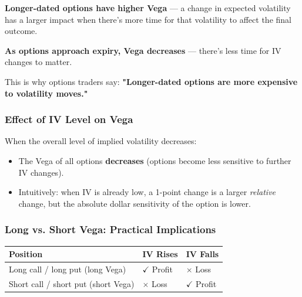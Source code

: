 \documentclass[12pt,openany]{book}
\begin{document}
\begin{center}
\end{center}


\textbf{Longer-dated options have higher Vega} — a change in expected volatility has a larger impact when there's more time for that volatility to affect the final outcome.

\textbf{As options approach expiry, Vega decreases} — there's less time for IV changes to matter.

This is why options traders say: \textbf{"Longer-dated options are more expensive to volatility moves."}

\subsubsection{Effect of IV Level on Vega}

When the overall level of implied volatility decreases:
\begin{itemize}[leftmargin=*]
    \item The Vega of all options \textbf{decreases} (options become less sensitive to further IV changes).
    \item Intuitively: when IV is already low, a 1-point change is a larger \emph{relative} change, but the absolute dollar sensitivity of the option is lower.
\end{itemize}

\subsubsection{Long vs. Short Vega: Practical Implications}

\begin{center}
\scriptsize
\setlength{\tabcolsep}{3pt}
\begin{tabular}{|L{4.1cm}|L{4.1cm}|L{4.1cm}|}
\hline
\textbf{Position} & \textbf{IV Rises} & \textbf{IV Falls} \\
\hline
Long call / long put (long Vega) & \(\checkmark\) Profit & \(\times\) Loss \\
\hline
Short call / short put (short Vega) & \(\times\) Loss & \(\checkmark\) Profit \\
\hline
\end{tabular}
\end{center}
\end{document}
